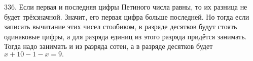 336. Если первая и последняя цифры Петиного числа равны, то их разница не будет трёхзначной. Значит, его первая цифра больше последней. Но тогда если записать вычитание этих чисел столбиком, в разряде десятков будут стоять одинаковые цифры, а для разряда единиц из этого разряда придётся занимать. Тогда надо занимать и из разряда сотен, а в разряде десятков будет $x+10-1-x=9.$\\

